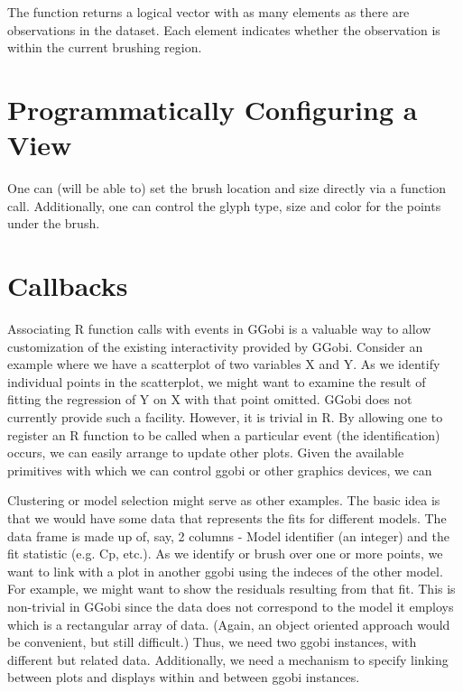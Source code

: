 \documentclass{article}
\begin{document}
The function  returns a logical
vector with as many elements as there are observations in the dataset.
Each element indicates whether the observation is within the current
brushing region.




\section{Programmatically Configuring a View} 
One can (will be able to) set the brush location and size directly via
a function call.  Additionally, one can control the glyph type, size
and color for the points under the brush.


\section{Callbacks}

Associating R function calls with events in GGobi
is a valuable way to allow customization of the existing interactivity
provided by GGobi.  Consider an example where we have a scatterplot of
two variables X and Y.  As we identify individual points in the
scatterplot, we might want to examine the result of fitting the
regression of Y on X with that point omitted.  GGobi does not
currently provide such a facility.  However, it is trivial in R.  By
allowing one to register an R function to be called when a particular
event (the identification) occurs, we can easily arrange to update
other plots.  Given the available primitives with which we can control
ggobi or other graphics devices, we can



Clustering or model selection might serve as other examples.  The
basic idea is that we would have some data that represents the fits
for different models.  The data frame is made up of, say, 2 columns -
Model identifier (an integer) and the fit statistic (e.g. Cp, etc.).
As we identify or brush over one or more points, we want to link with
a plot in another ggobi using the indeces of the other model.  For
example, we might want to show the residuals resulting from that fit.
This is non-trivial in GGobi since the data does not correspond to the
model it employs which is a rectangular array of data.  (Again, an
object oriented approach would be convenient, but still difficult.)
Thus, we need two ggobi instances, with different but related data.
Additionally, we need a mechanism to specify linking between plots and
displays within and between ggobi instances.
\end{document}
